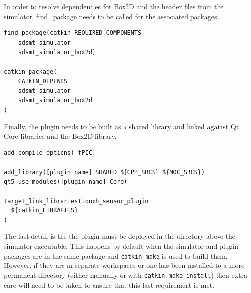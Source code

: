 \begin{itemize}
In order to resolve dependencies for Box2D and the header files from the simulator, find\_package needs to be called for the associated packages.
\begin{lstlisting}
find_package(catkin REQUIRED COMPONENTS
    sdsmt_simulator
    sdsmt_simulator_box2d)
    
catkin_package(
    CATKIN_DEPENDS
    sdsmt_simulator
    sdsmt_simulator_box2d
)
\end{lstlisting}


Finally, the plugin needs to be built as a shared library and linked against Qt Core libraries and the Box2D library.
\begin{lstlisting}
add_compile_options(-fPIC)

add_library([plugin name] SHARED ${CPP_SRCS} ${MOC_SRCS})
qt5_use_modules([plugin name] Core)

target_link_libraries(touch_sensor_plugin
  ${catkin_LIBRARIES}
)
\end{lstlisting}

The last detail is the the plugin must be deployed in the directory above the simulator executable. This happens by default when the simulator and plugin packages are in the same package and \lstinline|catkin_make| is used to build them. However, if they are in separate workspaces or one has been installed to a more permanent directory (either manually or with \lstinline|catkin_make install|) then extra care will need to be taken to ensure that this last requirement is met.

\end{itemize}